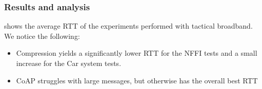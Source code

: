 \subsubsection{Results and analysis}

 shows the average RTT of the experiments
performed with tactical broadband. We notice the following:

\begin{itemize}

    \item Compression yields a significantly lower RTT for the NFFI tests and a
    small increase for the Car system tests.

    \item CoAP struggles with large messages, but otherwise has the overall best
    RTT

\end{itemize}

\begin{landscape}
    \begin{figure}
    \centering
    \begin{floatrow}
    \end{floatrow}
    \end{figure}
\end{landscape}

